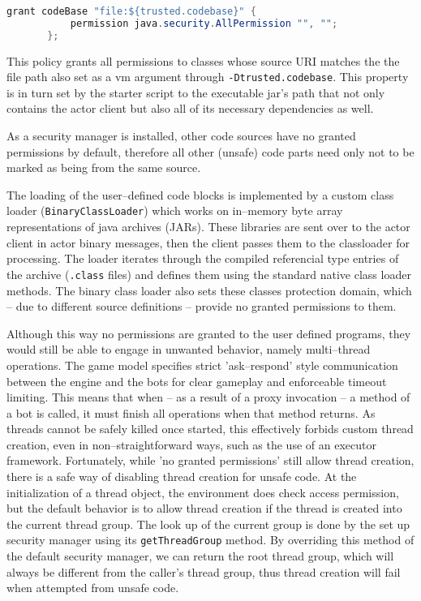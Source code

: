 \documentclass[11pt,a4paper,oneside]{report}
\newcommand{\code}{\texttt}
\begin{document}
			\begin{center}
				\begin{minipage}{11cm}
					\begin{lstlisting}[language=Java, title={\code{client.policy}}]
	   grant codeBase "file:${trusted.codebase}" {
		   permission java.security.AllPermission "", "";
	   };
					\end{lstlisting}
				\end{minipage}
			\end{center}
		
			This policy grants all permissions to classes whose source URI matches the the file path also set as a vm argument through \code{-Dtrusted.codebase}. This property is in turn set by the starter script to the executable jar's path that not only contains the actor client but also all of its necessary dependencies as well.
			
			As a security manager is installed, other code sources have no granted permissions by default, therefore all other (unsafe) code parts need only not to be marked as being from the same source.
			
			The loading of the user--defined code blocks is implemented by a custom class loader (\code{BinaryClassLoader}) which works on in--memory byte array representations of java archives (JARs). These libraries are sent over to the actor client in actor binary messages, then the client passes them to the classloader for processing. The loader iterates through the compiled referencial type entries of the archive (\code{.class} files) and defines them using the standard native class loader methods. The binary class loader also sets these classes protection domain, which -- due to different source definitions -- provide no granted permissions to them.
			
			Although this way no permissions are granted to the user defined programs, they would still be able to engage in unwanted behavior, namely multi--thread operations. The game model specifies strict 'ask--respond' style communication between the engine and the bots for clear gameplay and enforceable timeout limiting. This means that when -- as a result of a proxy invocation -- a method of a bot is called, it must finish all operations when that method returns. As threads cannot be safely killed once started, this effectively forbids custom thread creation, even in non--straightforward ways, such as the use of an executor framework. Fortunately, while 'no granted permissions' still allow thread creation, there is a safe way of disabling thread creation for unsafe code. At the initialization of a thread object, the environment does check access permission, but the default behavior is to allow thread creation if the thread is created into the current thread group. The look up of the current group is done by the set up security manager using its \code{getThreadGroup} method. By overriding this method of the default security manager, we can return the root thread group, which will always be different from the caller's thread group, thus thread creation will fail when attempted from unsafe code.
			
\end{document}
